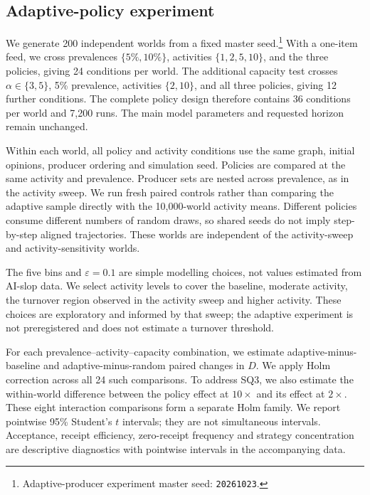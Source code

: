 \documentclass[runningheads]{llncs}
\begin{document}
\subsection{Adaptive-policy experiment}
\label{sec:adaptive-design}

We generate 200 independent worlds from a fixed master seed.\footnote{Adaptive-producer experiment master seed: \texttt{20261023}.} With a one-item feed, we cross prevalences \(\{5\%,10\%\}\), activities \(\{1,2,5,10\}\), and the three policies, giving 24 conditions per world. The additional capacity test crosses \(\alpha\in\{3,5\}\), 5\% prevalence, activities \(\{2,10\}\), and all three policies, giving 12 further conditions. The complete policy design therefore contains 36 conditions per world and 7,200 runs. The main model parameters and requested horizon remain unchanged.

Within each world, all policy and activity conditions use the same graph, initial opinions, producer ordering and simulation seed. Policies are compared at the same activity and prevalence. Producer sets are nested across prevalence, as in the activity sweep. We run fresh paired controls rather than comparing the adaptive sample directly with the 10,000-world activity means. Different policies consume different numbers of random draws, so shared seeds do not imply step-by-step aligned trajectories. These worlds are independent of the activity-sweep and activity-sensitivity worlds.

The five bins and \(\varepsilon=0.1\) are simple modelling choices, not values estimated from AI-slop data. We select activity levels to cover the baseline, moderate activity, the turnover region observed in the activity sweep and higher activity. These choices are exploratory and informed by that sweep; the adaptive experiment is not preregistered and does not estimate a turnover threshold.

For each prevalence--activity--capacity combination, we estimate adaptive-minus-baseline and adaptive-minus-random paired changes in \(D\). We apply Holm correction across all 24 such comparisons. To address SQ3, we also estimate the within-world difference between the policy effect at \(10\times\) and its effect at \(2\times\). These eight interaction comparisons form a separate Holm family. We report pointwise 95\% Student's \(t\) intervals; they are not simultaneous intervals. Acceptance, receipt efficiency, zero-receipt frequency and strategy concentration are descriptive diagnostics with pointwise intervals in the accompanying data.
\end{document}

